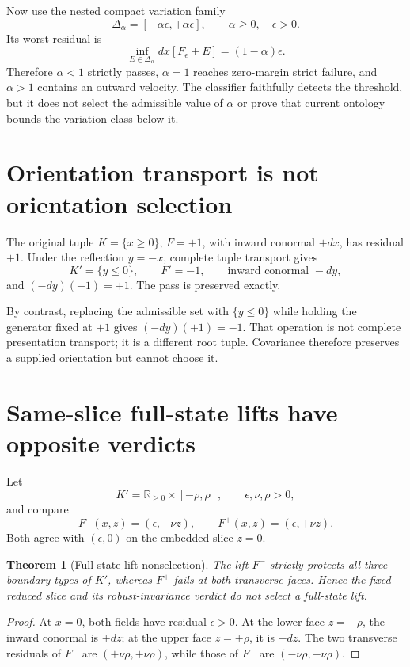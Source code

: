 \documentclass[11pt]{article}
\newtheorem{theorem}{Theorem}
\newcommand{\R}{\mathbb R}
\begin{document}
Now use the nested compact variation family
\[
 \Delta_\alpha=[-\alpha\epsilon,+\alpha\epsilon],
 \qquad \alpha\geq0,\quad \epsilon>0.
\]
Its worst residual is
\[
 \inf_{E\in\Delta_\alpha} dx[F_\epsilon+E]
 =(1-\alpha)\epsilon.
\]
Therefore \(\alpha<1\) strictly passes, \(\alpha=1\) reaches zero-margin
strict failure, and \(\alpha>1\) contains an outward velocity.  The
classifier faithfully detects the threshold, but it does not select the
admissible value of \(\alpha\) or prove that current ontology bounds the
variation class below it.

\section{Orientation transport is not orientation selection}

The original tuple \(K=\{x\geq0\}\), \(F=+1\), with inward conormal
\(+dx\), has residual \(+1\).  Under the reflection \(y=-x\), complete
tuple transport gives
\[
 K'=\{y\leq0\},\qquad F'=-1,\qquad \text{inward conormal }-dy,
\]
and \((-dy)(-1)=+1\).  The pass is preserved exactly.

By contrast, replacing the admissible set with \(\{y\leq0\}\) while holding
the generator fixed at \(+1\) gives \((-dy)(+1)=-1\).  That operation is not
complete presentation transport; it is a different root tuple.  Covariance
therefore preserves a supplied orientation but cannot choose it.

\section{Same-slice full-state lifts have opposite verdicts}

Let
\[
 K'=\R_{\geq0}\times[-\rho,\rho],
 \qquad \epsilon,\nu,\rho>0,
\]
and compare
\[
 F^{-}(x,z)=(\epsilon,-\nu z),
 \qquad
 F^{+}(x,z)=(\epsilon,+\nu z).
\]
Both agree with \((\epsilon,0)\) on the embedded slice \(z=0\).

\begin{theorem}[Full-state lift nonselection]
The lift \(F^{-}\) strictly protects all three boundary types of \(K'\),
whereas \(F^{+}\) fails at both transverse faces.  Hence the fixed reduced
slice and its robust-invariance verdict do not select a full-state lift.
\end{theorem}

\begin{proof}
At \(x=0\), both fields have residual \(\epsilon>0\).  At the lower face
\(z=-\rho\), the inward conormal is \(+dz\); at the upper face
\(z=+\rho\), it is \(-dz\).  The two transverse residuals of \(F^{-}\)
are \((+\nu\rho,+\nu\rho)\), while those of \(F^{+}\) are
\((-\nu\rho,-\nu\rho)\).
\end{proof}
\end{document}
